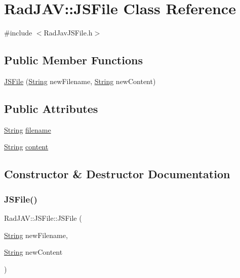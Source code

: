 \hypertarget{class_rad_j_a_v_1_1_j_s_file}{}\section{Rad\+J\+AV\+:\+:J\+S\+File Class Reference}
\label{class_rad_j_a_v_1_1_j_s_file}


{\ttfamily \#include $<$Rad\+Jav\+J\+S\+File.\+h$>$}

\subsection*{Public Member Functions}
\begin{DoxyCompactItemize}
\item 
\mbox{\hyperlink{class_rad_j_a_v_1_1_j_s_file_aec38c6ca03d9e0c1287e26dd96e0922e}{J\+S\+File}} (\mbox{\hyperlink{class_rad_j_a_v_1_1_string}{String}} new\+Filename, \mbox{\hyperlink{class_rad_j_a_v_1_1_string}{String}} new\+Content)
\end{DoxyCompactItemize}
\subsection*{Public Attributes}
\begin{DoxyCompactItemize}
\item 
\mbox{\hyperlink{class_rad_j_a_v_1_1_string}{String}} \mbox{\hyperlink{class_rad_j_a_v_1_1_j_s_file_aa7c2f26ad7b8ea9966ea9e071ab437fa}{filename}}
\item 
\mbox{\hyperlink{class_rad_j_a_v_1_1_string}{String}} \mbox{\hyperlink{class_rad_j_a_v_1_1_j_s_file_adb76fa6ce7cc1d4e54af4050849cf9a1}{content}}
\end{DoxyCompactItemize}


\subsection{Constructor \& Destructor Documentation}
\mbox{\label{class_rad_j_a_v_1_1_j_s_file_aec38c6ca03d9e0c1287e26dd96e0922e}} 
\subsubsection{\texorpdfstring{J\+S\+File()}{JSFile()}}
{\footnotesize\ttfamily Rad\+J\+A\+V\+::\+J\+S\+File\+::\+J\+S\+File (\begin{DoxyParamCaption}\item[{\mbox{\hyperlink{class_rad_j_a_v_1_1_string}{String}}}]{new\+Filename,  }\item[{\mbox{\hyperlink{class_rad_j_a_v_1_1_string}{String}}}]{new\+Content }\end{DoxyParamCaption})\hspace{0.3cm}{\ttfamily [inline]}}



